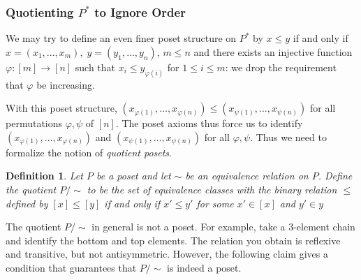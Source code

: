 \documentclass[acmsmall,review,anonymous]{acmart}\settopmatter{printfolios=true,printccs=false,printacmref=false}
\newtheorem{definition}{Definition}
\begin{document}
\subsubsection{Quotienting $P^*$ to Ignore Order}
We may try to define an even finer poset structure on $P^*$ by $x \leq y$ if and
only if $x = (x_1, \ldots, x_m), \; y = (y_1, \ldots, y_n)$, $m \leq n$ and
there exists an injective function $\varphi : [m] \longrightarrow [n]$ such
that $x_i \leq y_{\varphi(i)}$ for $1 \leq i \leq m$: we drop the requirement
that $\varphi$ be increasing.

With this poset structure, $(x_{\varphi(1)}, \ldots, x_{\varphi(n)}) \leq
(x_{\psi(1)}, \ldots, x_{\psi(n)})$ for all permutations
$\varphi, \psi$ of $[n]$. The poset axioms thus force us to identify
$(x_{\varphi(1)}, \ldots, x_{\varphi(n)})$ and $(x_{\psi(1)}, \ldots,
x_{\psi(n)})$ for all $\varphi, \psi$. Thus we need to formalize the notion of
{\em quotient posets}.

\begin{definition}
Let $P$ be a poset and let $\sim$ be an equivalence relation on $P$. Define the
quotient $P/{\sim}$ to be the set of equivalence classes with the binary
relation $\leq$ defined by $[x] \leq [y]$ if and only if $x' \leq y'$ for some
$x' \in [x]$ and $y' \in y$
\end{definition}
The quotient $P/{\sim}$ in general is not a poset. For example, take a
3-element chain and identify the bottom and top elements. The relation you
obtain is reflexive and transitive, but not antisymmetric. However, the
following claim gives a condition that guarantees that $P/{\sim}$ is indeed a
poset.
\end{document}
